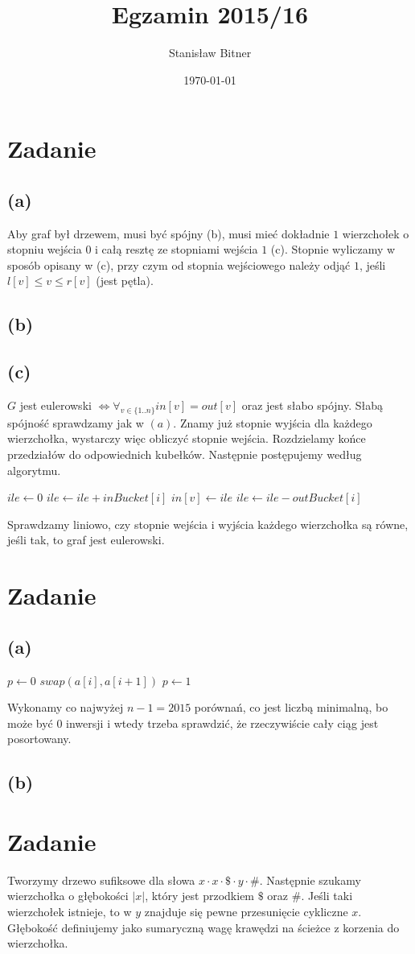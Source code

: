 \documentclass[12pt, a4paper]{article}
\title{Egzamin 2015/16}
\author{Stanisław Bitner}
\date{\today}
\newcounter{zadanie}
\newcommand{\zadanie}{\addtocounter{zadanie}{1}\section*{Zadanie \arabic{zadanie}}}
\begin{document}
\maketitle
\zadanie{}
\subsection*{(a)}
Aby graf był drzewem, musi być spójny (b), musi mieć dokładnie $1$ wierzchołek
o stopniu wejścia $0$ i całą resztę ze stopniami wejścia $1$ (c). Stopnie
wyliczamy w sposób opisany w (c), przy czym od stopnia wejściowego należy odjąć
$1$, jeśli $l[v] \le v \le r[v]$ (jest pętla).

\subsection*{(b)}

\subsection*{(c)}
$G$ jest eulerowski $\iff \forall_{v\in \{1..n\}} in[v] = out[v]$ oraz jest
słabo spójny. Słabą spójność sprawdzamy jak w $(a)$. Znamy już stopnie wyjścia
dla każdego wierzchołka, wystarczy więc obliczyć stopnie wejścia. Rozdzielamy
końce przedziałów do odpowiednich kubełków. Następnie postępujemy według
algorytmu.
\begin{algorithmic}
\State $ile \gets 0$
  \State $ile \gets ile + inBucket[i]$
  \State $in[v] \gets ile$
  \State $ile \gets ile - outBucket[i]$
\EndFor
\end{algorithmic}
Sprawdzamy liniowo, czy stopnie wejścia i wyjścia każdego wierzchołka są równe,
jeśli tak, to graf jest eulerowski.

\zadanie{}
\subsection*{(a)}
\begin{algorithmic}
\State $p \gets 0$
    \State $swap(a[i], a[i+1])$
      \State \Return
    \EndIf
    \State $p \gets 1$
  \EndIf
\EndFor
\end{algorithmic}
Wykonamy co najwyżej $n-1 = 2015$ porównań, co jest liczbą minimalną, bo może
być $0$ inwersji i wtedy trzeba sprawdzić, że rzeczywiście cały ciąg jest
posortowany.

\subsection*{(b)}

\zadanie{}
Tworzymy drzewo sufiksowe dla słowa $x \cdot x \cdot \$ \cdot y \cdot \#$.
Następnie szukamy wierzchołka o głębokości $|x|$, który jest przodkiem $\$$
oraz $\#$. Jeśli taki wierzchołek istnieje, to w $y$ znajduje się pewne
przesunięcie cykliczne $x$. Głębokość definiujemy jako sumaryczną wagę krawędzi
na ścieżce z korzenia do wierzchołka.
\end{document}
